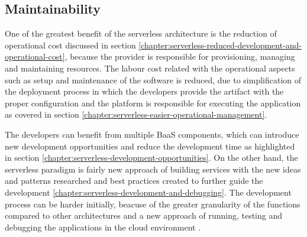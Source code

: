 

\subsection*{Maintainability} \label{chapter:serverless-suitability-maintainability}

One of the greatest benefit of the serverless architecture is the reduction of operational cost discussed in section \ref{chapter:serverless-reduced-development-and-operational-cost}, because the provider is responsible for provisioning, managing and maintaining resources. The labour cost related with the operational aspects such as setup and maintenance of the software is reduced, due to simplification of the deployment process in which the developers provide the artifact with the proper configuration and the platform is responsible for executing the application as covered in section \ref{chapter:serverless-easier-operational-management}.

The developers can benefit from multiple BaaS components, which can introduce new development opportunities and reduce the development time as highlighted in section \ref{chapter:serverless-development-opportunities}. On the other hand, the serverless paradigm is fairly new approach of building services with the new ideas and patterns researched and best practices created to further guide the development \ref{chapter:serverless-development-and-debugging}.
The development process can be harder initially, beacuse of the greater granularity of the functions compared to other architectures and a new approach of running, testing and debugging the applications in the cloud environment \cite{EvaluationOfServerlessApplicationProgrammingModel}.

